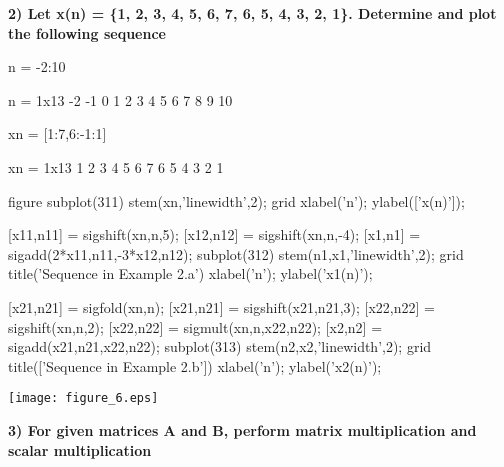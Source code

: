 \documentclass[12pt, onecolumn]{IEEEtran}
\begin{document}
	\begin{par}
		\begin{flushleft}
			\textbf{2) Let x(n) = \{1, 2, 3, 4, 5, 6, 7, 6, 5, 4, 3, 2, 1\}. Determine and plot the following sequence}
		\end{flushleft}
	\end{par}
	
	\begin{par}
		\begin{flushleft}
		\end{flushleft}
	\end{par}
	
	\begin{matlabcode}
		n = -2:10 
	\end{matlabcode}
	\begin{matlaboutput}
		n = 1x13    
		-2    -1     0     1     2     3     4     5     6     7     8     9    10
		
	\end{matlaboutput}
	\begin{matlabcode}
		xn = [1:7,6:-1:1]
	\end{matlabcode}
	\begin{matlaboutput}
		xn = 1x13    
		1     2     3     4     5     6     7     6     5     4     3     2     1
		
	\end{matlaboutput}
	\begin{matlabcode}
		figure
		subplot(311)
		stem(xn,'linewidth',2); grid
		xlabel('n'); 
		ylabel(['x(n)']);
		
		[x11,n11] = sigshift(xn,n,5);
		[x12,n12] = sigshift(xn,n,-4);
		[x1,n1] = sigadd(2*x11,n11,-3*x12,n12);
		subplot(312)
		stem(n1,x1,'linewidth',2); grid
		title('Sequence in Example 2.a')
		xlabel('n'); 
		ylabel('x1(n)');
		
		[x21,n21] = sigfold(xn,n); 
		[x21,n21] = sigshift(x21,n21,3);
		[x22,n22] = sigshift(xn,n,2); 
		[x22,n22] = sigmult(xn,n,x22,n22);
		[x2,n2] = sigadd(x21,n21,x22,n22);
		subplot(313)
		stem(n2,x2,'linewidth',2); grid
		title(['Sequence in Example 2.b'])
		xlabel('n'); 
		ylabel('x2(n)');
	\end{matlabcode}
	\begin{center}
		\texttt{[image: figure\_6.eps]}
	\end{center}
	
	\begin{par}
		\begin{flushleft}
			\textbf{3) For given matrices A and B, perform matrix multiplication and scalar multiplication}
		\end{flushleft}
	\end{par}
	
\end{document}
